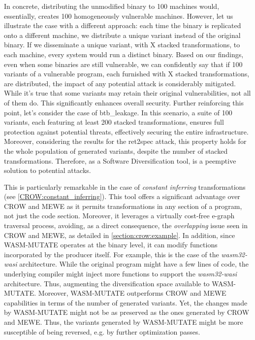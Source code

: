 In concrete, distributing the unmodified binary to 100 machines would, essentially, creates 100 homogeneously vulnerable machines.
However, let us illustrate the case with a different approach: each time the binary is replicated onto a different machine, we distribute a unique variant instead of the original binary. 
If we disseminate a unique variant, with X stacked transformations, to each machine, every system would run a distinct \wasm binary. 
Based on our findings, even when some binaries are still vulnerable, we can confidently say that if 100 variants of a vulnerable program, each furnished with X stacked transformations, are distributed, the impact of any potential attack is considerably mitigated.
While it's true that some variants may retain their original vulnerabilities, not all of them do. 
This significantly enhances overall security. 
Further reinforcing this point, let's consider the case of btb\_leakage. 
In this scenario, a suite of 100 variants, each featuring at least 200 stacked transformations, ensures full protection against potential threats, effectively securing the entire infrastructure.
Moreover, considering the results for the ret2spec attack, this property holds for the whole population of generated variants, despite the number of stacked transformations.
Therefore, \tool as a Software Diversification tool, is a peemptive solution to potential attacks.

This is particularly remarkable in the case of \emph{constant inferring} transformations (see \autoref{CROW:constant_inferring}).
This tool offers a significant advantage over CROW and MEWE as it permits transformations in any section of a \wasm program, not just the code section.
Moreover, it leverages a virtually cost-free e-graph traversal process, avoiding, as a direct consequence, the \emph{overlapping} issue seen in CROW and MEWE, as detailed in \autoref{section:crow:example}. 
In addition, since WASM-MUTATE operates at the binary level, it can modify functions incorporated by the \Wasm producer itself.
For example, this is the case of the \emph{wasm32-wasi} architecture.
While the original program might have a few lines of code, the underlying compiler might inject more functions to support the \emph{wasm32-wasi} architecture.
Thus, augmenting the diversification space available to WASM-MUTATE.
Moreover, WASM-MUTATE outperforms CROW and MEWE capabilities in terms of the number of generated variants.
Yet, the changes made by WASM-MUTATE might not be as preserved as the ones generated by CROW and MEWE.
Thus, the variants generated by WASM-MUTATE might be more susceptible of being reversed, e.g. by further optimization passes.


